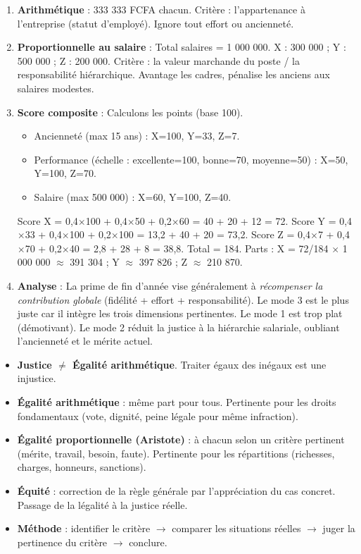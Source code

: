 \documentclass[11pt]{article}
\begin{document}
\begin{corrige}[Exercice n°1]
\begin{enumerate}
    \item \textbf{Arithmétique} : 333 333 FCFA chacun. Critère : l'appartenance à l'entreprise (statut d'employé). Ignore tout effort ou ancienneté.
    \item \textbf{Proportionnelle au salaire} : Total salaires = 1 000 000. X : 300 000 ; Y : 500 000 ; Z : 200 000. Critère : la valeur marchande du poste / la responsabilité hiérarchique. Avantage les cadres, pénalise les anciens aux salaires modestes.
    \item \textbf{Score composite} : Calculons les points (base 100).
    \begin{itemize}
        \item Ancienneté (max 15 ans) : X=100, Y=33, Z=7.
        \item Performance (échelle : excellente=100, bonne=70, moyenne=50) : X=50, Y=100, Z=70.
        \item Salaire (max 500 000) : X=60, Y=100, Z=40.
    \end{itemize}
    Score X = 0,4$\times$100 + 0,4$\times$50 + 0,2$\times$60 = 40 + 20 + 12 = 72.
    Score Y = 0,4$\times$33 + 0,4$\times$100 + 0,2$\times$100 = 13,2 + 40 + 20 = 73,2.
    Score Z = 0,4$\times$7 + 0,4$\times$70 + 0,2$\times$40 = 2,8 + 28 + 8 = 38,8.
    Total = 184. Parts : X = 72/184 $\times$ 1 000 000 $\approx$ 391 304 ; Y $\approx$ 397 826 ; Z $\approx$ 210 870.
    \item \textbf{Analyse} : La prime de fin d'année vise généralement à \emph{récompenser la contribution globale} (fidélité + effort + responsabilité). Le mode 3 est le plus juste car il intègre les trois dimensions pertinentes. Le mode 1 est trop plat (démotivant). Le mode 2 réduit la justice à la hiérarchie salariale, oubliant l'ancienneté et le mérite actuel.
\end{enumerate}
\end{corrige}

\begin{aretenir}
\begin{itemize}
    \item \textbf{Justice $\neq$ Égalité arithmétique}. Traiter égaux des inégaux est une injustice.
    \item \textbf{Égalité arithmétique} : même part pour tous. Pertinente pour les droits fondamentaux (vote, dignité, peine légale pour même infraction).
    \item \textbf{Égalité proportionnelle (Aristote)} : à chacun selon un critère pertinent (mérite, travail, besoin, faute). Pertinente pour les répartitions (richesses, charges, honneurs, sanctions).
    \item \textbf{Équité} : correction de la règle générale par l'appréciation du cas concret. Passage de la légalité à la justice réelle.
    \item \textbf{Méthode} : identifier le critère $\rightarrow$ comparer les situations réelles $\rightarrow$ juger la pertinence du critère $\rightarrow$ conclure.
\end{itemize}
\end{aretenir}
\end{document}
